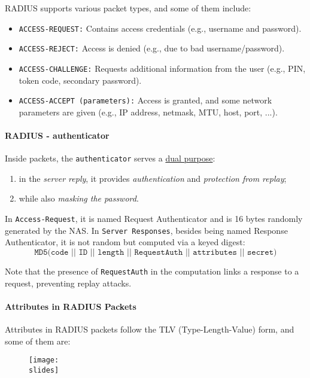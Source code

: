 \vspace*{7mm}    
RADIUS supports various packet types, and some of them include:

\begin{itemize}
    \item \texttt{ACCESS-REQUEST:} Contains access credentials (e.g., username and password).
    \item \texttt{ACCESS-REJECT:} Access is denied (e.g., due to bad username/password).
    \item \texttt{ACCESS-CHALLENGE:} Requests additional information from the user (e.g., PIN, token code, secondary password).
    \item \texttt{ACCESS-ACCEPT (parameters):} Access is granted, and some network parameters are given (e.g., IP address, netmask, MTU, host, port, ...).
\end{itemize}


\paragraph{RADIUS - authenticator}
Inside packets, the \texttt{authenticator} serves a \underline{dual purpose}: 
\begin{enumerate}
    \item in the \textit{server reply}, it provides \textit{authentication} and \textit{protection from replay};
    \item while also \textit{masking the password}.
\end{enumerate}

In \texttt{Access-Request}, it is named Request Authenticator and is 16 bytes randomly generated by the NAS. In \texttt{Server Responses}, besides being named Response Authenticator, it is not random but computed via a keyed digest:
\[
\texttt{MD5(code || ID || length || RequestAuth || attributes || secret)} 
\]

Note that the presence of \texttt{RequestAuth} in the computation links a response to a request, preventing replay attacks.



\paragraph{Attributes in RADIUS Packets}
Attributes in RADIUS packets follow the TLV (Type-Length-Value) form, and some of them are:

\begin{figure}[H]
    \centering
    \texttt{[image: \\slides]}
\end{figure}

